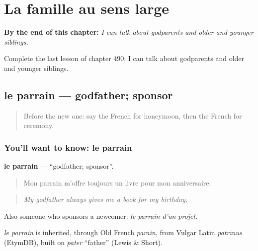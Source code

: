 
\chapter{La famille au sens large}
\label{ch:fr-la-famille-au-sens-large}

\begin{chapteropening}
\textbf{By the end of this chapter:} \emph{I can talk about godparents and older and younger siblings.}

Complete the last lesson of chapter 490: I can talk about godparents and older and younger siblings.
\end{chapteropening}

\section[le parrain]{le parrain — godfather; sponsor}

\label{lesson:FR-C490-parrain}



\begin{quote}
Before the new one: say the French for honeymoon, then the French for ceremony.
\end{quote}

\subsection*{You'll want to know: le parrain}
\textbf{le parrain} — \textquotedblleft{}godfather; sponsor\textquotedblright{}.

\begin{quote}
Mon parrain m'offre toujours un livre pour mon anniversaire.
\end{quote}

\begin{quote}
\emph{My godfather always gives me a book for my birthday.}
\end{quote}

Also someone who sponsors a newcomer: \emph{le parrain d'un projet}.

\begin{cousinweb}
\emph{le parrain} is inherited, through Old French \emph{parain}, from Vulgar Latin \emph{patrīnus} (EtymDB), built on \emph{pater} \textquotedblleft{}father\textquotedblright{} (Lewis \& Short).
\end{cousinweb}


